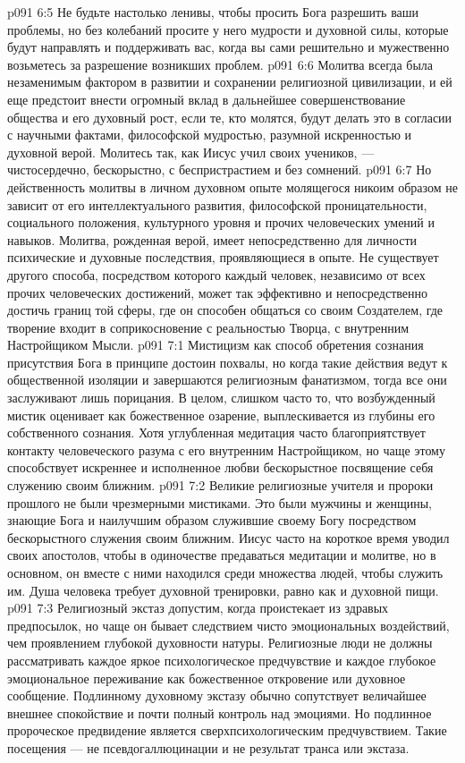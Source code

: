 \vs p091 6:5 \pc Не будьте настолько ленивы, чтобы просить Бога разрешить ваши проблемы, но без колебаний просите у него мудрости и духовной силы, которые будут направлять и поддерживать вас, когда вы сами решительно и мужественно возьметесь за разрешение возникших проблем.
\vs p091 6:6 \pc Молитва всегда была незаменимым фактором в развитии и сохранении религиозной цивилизации, и ей еще предстоит внести огромный вклад в дальнейшее совершенствование общества и его духовный рост, если те, кто молятся, будут делать это в согласии с научными фактами, философской мудростью, разумной искренностью и духовной верой. Молитесь так, как Иисус учил своих учеников, --- чистосердечно, бескорыстно, с беспристрастием и без сомнений.
\vs p091 6:7 Но действенность молитвы в личном духовном опыте молящегося никоим образом не зависит от его интеллектуального развития, философской проницательности, социального положения, культурного уровня и прочих человеческих умений и навыков. Молитва, рожденная верой, имеет непосредственно для личности психические и духовные последствия, проявляющиеся в опыте. Не существует другого способа, посредством которого каждый человек, независимо от всех прочих человеческих достижений, может так эффективно и непосредственно достичь границ той сферы, где он способен общаться со своим Создателем, где творение входит в соприкосновение с реальностью Творца, с внутренним Настройщиком Мысли.
\vs p091 7:1 Мистицизм как способ обретения сознания присутствия Бога в принципе достоин похвалы, но когда такие действия ведут к общественной изоляции и завершаются религиозным фанатизмом, тогда все они заслуживают лишь порицания. В целом, слишком часто то, что возбужденный мистик оценивает как божественное озарение, выплескивается из глубины его собственного сознания. Хотя углубленная медитация часто благоприятствует контакту человеческого разума с его внутренним Настройщиком, но чаще этому способствует искреннее и исполненное любви бескорыстное посвящение себя служению своим ближним.
\vs p091 7:2 Великие религиозные учителя и пророки прошлого не были чрезмерными мистиками. Это были мужчины и женщины, знающие Бога и наилучшим образом служившие своему Богу посредством бескорыстного служения своим ближним. Иисус часто на короткое время уводил своих апостолов, чтобы в одиночестве предаваться медитации и молитве, но в основном, он вместе с ними находился среди множества людей, чтобы служить им. Душа человека требует духовной тренировки, равно как и духовной пищи.
\vs p091 7:3 Религиозный экстаз допустим, когда проистекает из здравых предпосылок, но чаще он бывает следствием чисто эмоциональных воздействий, чем проявлением глубокой духовности натуры. Религиозные люди не должны рассматривать каждое яркое психологическое предчувствие и каждое глубокое эмоциональное переживание как божественное откровение или духовное сообщение. Подлинному духовному экстазу обычно сопутствует величайшее внешнее спокойствие и почти полный контроль над эмоциями. Но подлинное пророческое предвидение является сверхпсихологическим предчувствием. Такие посещения --- не псевдогаллюцинации и не результат транса или экстаза.
